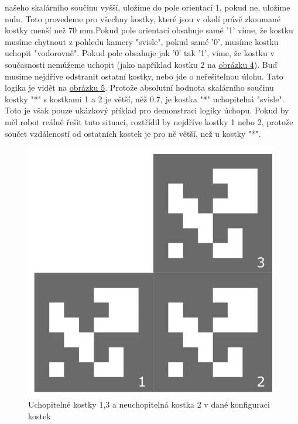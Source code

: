 \documentclass[journal,twoside,web]{ieeecolor}
\begin{document}
našeho skalárního součinu vyšší, uložíme do pole orientací 1, pokud ne, uložíme nulu. Toto provedeme pro všechny kostky, které jsou v okolí právě zkoumané kostky %
menší než 70 mm.Pokud pole orientací obsahuje samé '1' víme, že kostku musíme chytnout z pohledu kamery "svisle", pokud samé '0', musíme kostku uchopit "vodorovně". %
Pokud pole obsahuje jak '0' tak '1', víme, že kostku v současnosti nemůžeme uchopit (jako například kostku 2 na \hyperlink{cube_config}{obrázku 4}). Buď musíme nejdříve odstranit ostatní kostky, nebo jde o neřešitelnou úlohu.
Tato logika je vidět na \hyperlink{scalar_logic}{obrázku 5}. Protože absolutní hodnota skalárního součinu kostky "*" s kostkami 1 a 2 je větší, něž 0.7, je kostka "*"
uchopitelná "svisle". Toto je však pouze ukázkový příklad pro demonstraci logiky úchopu. Pokud by měl robot reálně řešit tuto situaci,
roztřídil by nejdříve kostky 1 nebo 2, protože součet vzdáleností od ostatních kostek je pro ně větší, než u kostky "*".
\begin{figure}[h!]
    \centering
    \hypertarget{cube_config}{}
    \includegraphics[width=0.8\linewidth]{images/neuchopitelna}
    \caption{Uchopitelné kostky 1,3 a neuchopitelná kostka 2 v dané konfiguraci kostek}
    \label{fig:cube_config}
\end{figure}\\
\end{document}
